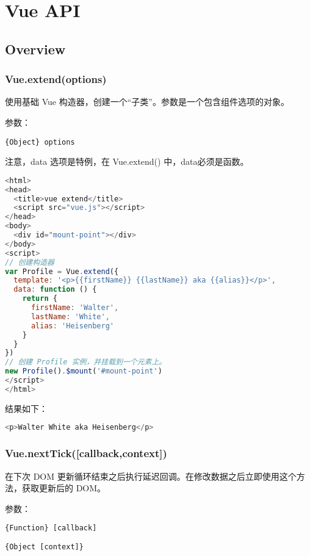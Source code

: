 \part{Vue API}


\chapter{Overview}


\section{Vue.extend(options)}

使用基础 Vue 构造器，创建一个“子类”。参数是一个包含组件选项的对象。

参数：


\begin{compactitem}
\item \texttt{\{Object\} options}
\end{compactitem}


注意，data 选项是特例，在 Vue.extend() 中，data必须是函数。

\begin{lstlisting}[language=JavaScript]
<html>
<head>
  <title>vue extend</title>
  <script src="vue.js"></script>
</head>
<body>
  <div id="mount-point"></div>
</body>
<script>
// 创建构造器
var Profile = Vue.extend({
  template: '<p>{{firstName}} {{lastName}} aka {{alias}}</p>',
  data: function () {
    return {
      firstName: 'Walter',
      lastName: 'White',
      alias: 'Heisenberg'
    }
  }
})
// 创建 Profile 实例，并挂载到一个元素上。
new Profile().$mount('#mount-point')
</script>
</html>
\end{lstlisting}

结果如下：



\begin{lstlisting}[language=JavaScript]
<p>Walter White aka Heisenberg</p>
\end{lstlisting}

\section{Vue.nextTick([callback,context])}

在下次 DOM 更新循环结束之后执行延迟回调。在修改数据之后立即使用这个方法，获取更新后的 DOM。

参数：

\begin{compactitem}
\item \texttt{\{Function\} [callback]}
\item \texttt{\{Object [context]\}}
\end{compactitem}


